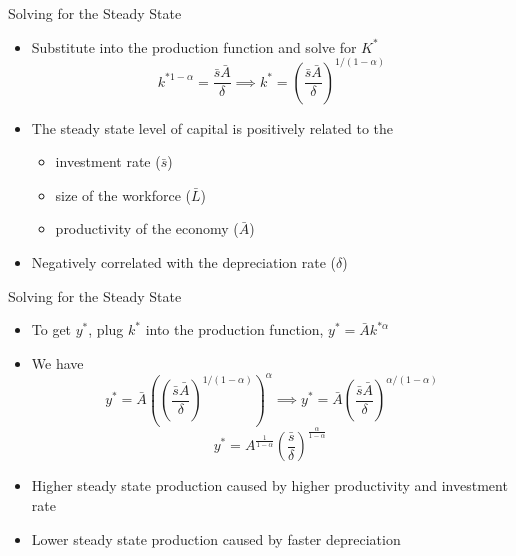 \documentclass[aspectratio=1610]{beamer}
\begin{document}
\begin{frame}[wide]{Solving for the Steady State}
	\begin{itemize}
		\item Substitute into the production function and solve for $K^*$
		 \[ k^{* 1 - \alpha}= \frac{\bar{s} \bar{A}}{\delta}   \implies k^{*}= \left(\frac{\bar{s} \bar{A}}{\delta}\right)^{1/(1 - \alpha)} \]
		 \item The steady state level of capital is positively related to the
		 \begin{itemize}
		 	\item investment rate ($\bar{s}$)
			\item size of the workforce ($\bar{L}$)
			\item productivity of the economy ($\bar{A}$)
		 \end{itemize}
		 \item Negatively correlated with the depreciation rate ($\delta$)
	\end{itemize}
\end{frame}

\begin{frame}[wide]{Solving for the Steady State}
	\begin{itemize}
		\item To get $y^*$, plug $k^*$ into the production function, $y^*=\bar{A} k^{*\alpha}$
		\item We have
		\[y^*=\bar{A} \left(\left(\frac{\bar{s} \bar{A}}{\delta}\right)^{1/(1 - \alpha)}   \right)^{\alpha}  \implies y^* = \bar{A} \left(\frac{\bar{s} \bar{A}}{\delta}\right)^{\alpha/(1 - \alpha)}   \]
		\[y^* = A^{\frac{1}{1-\alpha}}\left(\frac{\bar{s} }{\delta}\right)^{\frac{\alpha}{1 - \alpha}}  \ \]
		\item Higher steady state production caused by higher productivity and investment rate
		\item Lower steady state production caused by faster depreciation
	\end{itemize}
\end{frame}
\end{document}
